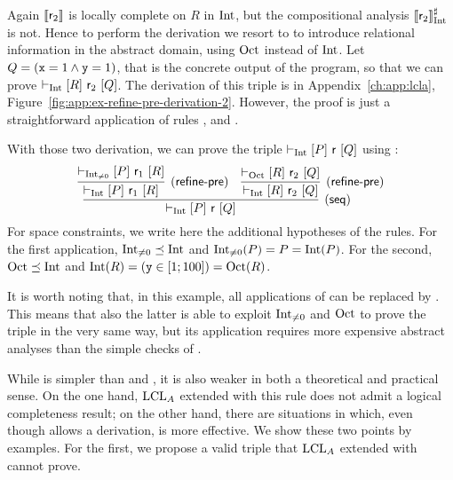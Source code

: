 \begin{example}
	Again $\llbracket\mathsf{r}_2\rrbracket$ is locally complete on $R$ in $\text{Int}$, but the compositional analysis $\llbracket\mathsf{r}_2\rrbracket^{\sharp}_{\text{Int}}$ is not. Hence to perform the derivation we resort to  to introduce relational information in the abstract domain, using $\text{Oct}$ instead of $\text{Int}$. Let $Q = (\texttt{x} = 1 \land \texttt{y} = 1)$, that is the concrete output of the program, so that we can prove $\vdash_{\text{Int}}\nobreak[R]~\mathsf{r}_2~[Q]$.
	The derivation of this triple is in Appendix~\ref{ch:app:lcla}, Figure~\ref{fig:app:ex-refine-pre-derivation-2}. However, the proof is just a straightforward application of rules ,  and .

	With those two derivation, we can prove the triple $\vdash_{\text{Int}}\nobreak[P]~\mathsf{r}~[Q]$ using :
	\[
	\infer[(\mathsf{seq})]
	{\lcl{\Int}{P}{\regr}{Q}}
	{
		\infer[(\mathsf{refine\mbox{-}pre})]
		{\lcl{\Int}{P}{\regr_1}{R}}
		{\lcl{\Int_{\neq 0}}{P}{\regr_1}{R}}
		&
		\infer[(\mathsf{refine\mbox{-}pre})]
		{\lcl{\Int}{R}{\regr_2}{Q}}
		{\lcl{\Oct}{R}{\regr_2}{Q}}
	}
	\]
	For space constraints, we write here the additional hypotheses of the rules. For the first application, $\text{Int}_{\neq 0} \preceq \text{Int}$ and $\text{Int}_{\neq 0}(P) = P = \text{Int}(P)$. For the second, $\text{Oct} \preceq \text{Int}$ and $\text{Int}(R) = (\texttt{y} \in [1; 100]) = \text{Oct}(R)$.

	It is worth noting that, in this example, all applications of  can be replaced by . This means that also the latter is able to exploit $\text{Int}_{\neq 0}$ and $\text{Oct}$ to prove the triple in the very same way, but its application requires more expensive abstract analyses than the simple checks of .
\end{example}

While  is simpler than  and , it is also weaker in both a theoretical and practical sense. On the one hand, $\text{LCL}_A$ extended with this rule does not admit a logical completeness result; on the other hand, there are situations in which, even though  allows a derivation,  is more effective. We show these two points by examples.
For the first, we propose a valid triple that $\text{LCL}_A$ extended with  cannot prove.

